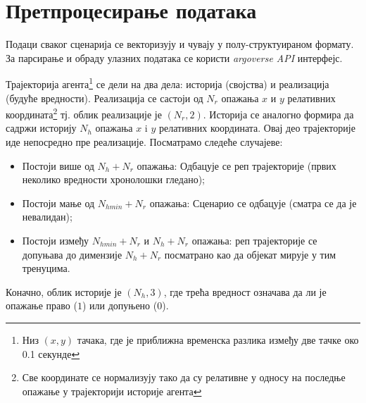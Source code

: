 \documentclass[11pt,oneside]{memoir}
\begin{document}
\section{Претпроцесирање података}

\noindent Подаци сваког сценарија се векторизују и чувају у полу-структуираном формату. 
За парсирање и обраду улазних података се користи \textit{argoverse API} интерфејс.


Трајекторија агента\footnote{Низ $(x, y)$ тачака, где је приближна временска разлика између две тачке око 0.1 секунде} 
се дели на два дела: историја (својства) и реализација (будуће вредности). Реализација се састоји од $N_r$ 
опажања $x$ и $y$ релативних координата\footnote{Све координате се нормализују тако да су релативне у односу на последње опажање у трајекторији историје агента} 
тј. облик реализације је $(N_r, 2)$. 
Историја се аналогно формира да садржи историју $N_h$ опажања $x$ i $y$ релативних координата. Овај део трајекторије иде непосредно
пре реализације. Посматрамо следеће случајеве:
\begin{itemize}
  \item Постоји више од $N_h + N_r$ опажања: Одбацује се реп трајекторије (првих неколико вредности хронолошки гледано);
  \item Постоји мање од $N_{hmin} + N_r$ опажања: Сценарио се одбацује (сматра се да је невалидан);
  \item Постоји између $N_{hmin} + N_r$ и $N_h + N_r$ опажања: реп трајекторије се допуњава до димензије $N_h + N_r$ 
  посматрано као да објекат мирује у тим тренуцима.
\end{itemize}
Коначно, облик историје је $(N_h, 3)$, где трећа вредност означава да ли је опажање право ($1$) или допуњено ($0$).
\end{document}

